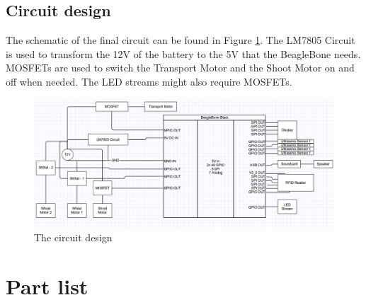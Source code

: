 \documentclass[11pt,twoside,a4paper]{report}
\begin{document}
\subsection{Circuit design}
The schematic of the final circuit can be found in Figure \ref{fig:electronics}. The LM7805 Circuit is used to transform the 12V of the battery to the 5V that the BeagleBone needs. MOSFETs are used to switch the Transport Motor and the Shoot Motor on and off when needed. The LED streams might also require MOSFETs. 
\begin{figure}[H]
\begin{center}
\includegraphics[width = 17cm]{Images/ElectronicalDiagram.png}
\caption{The circuit design}
\label{fig:electronics}
\end{center}
\end{figure}

\section{Part list}
\end{document}
